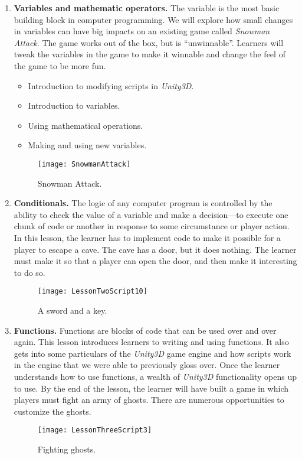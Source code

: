 \documentclass{article}
\begin{document}
\begin{enumerate}
\item {\bf Variables and mathematic operators.} 
The variable is the most basic building block in computer programming. 
We will explore how small changes in variables can have big impacts on an existing game called {\em Snowman Attack}. 
The game works out of the box, but is ``unwinnable''.
Learners will tweak the variables in the game to make it winnable and change the feel of the game to be more fun.
	\begin{itemize}
	\item Introduction to modifying scripts in {\em Unity3D}.
	\item Introduction to variables.
	\item Using mathematical operations.
	\item Making and using new variables.
	\end{itemize}
\begin{figure}[h]
\centering
\texttt{[image: SnowmanAttack]}
\caption{Snowman Attack.}
\end{figure}
	
\item {\bf Conditionals.}
The logic of any computer program is controlled by the ability to check the value of a variable and make a decision---to execute one chunk of code or another in response to some circumstance or player action.
In this lesson, the learner has to implement code to make it possible for a player to escape a cave.
The cave has a door, but it does nothing. The learner must make it so that a player can open the door, and then make it interesting to do so.
\begin{figure}[h]
\centering
\texttt{[image: LessonTwoScript10]}
\caption{A sword and a key.}
\end{figure}

\item {\bf Functions.}
Functions are blocks of code that can be used over and over again. 
This lesson introduces learners to writing and using functions.
It also gets into some particulars of the {\em Unity3D} game engine and how scripts work in the engine that we were able to previously gloss over.
Once the learner understands how to use functions, a wealth of {\em Unity3D} functionality opens up to use.
By the end of the lesson, the learner will have built a game in which players must fight an army of ghosts.
There are numerous opportunities to customize the ghosts.
\begin{figure}[h]
\centering
\texttt{[image: LessonThreeScript3]}
\caption{Fighting ghosts.}
\end{figure}


\end{enumerate}
\end{document}
